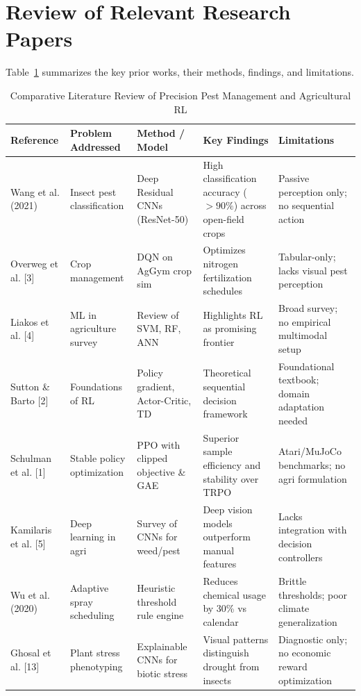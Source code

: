 \documentclass[12pt,a4paper]{report}
\begin{document}
\section{Review of Relevant Research Papers}
Table~\ref{tab:lit_review} summarizes the key prior works, their methods, findings, and limitations.

\begin{table}[H]
\centering
\small
\caption{Comparative Literature Review of Precision Pest Management and Agricultural RL}
\label{tab:lit_review}
\begin{tabular}{p{2.3cm}p{2.6cm}p{2.6cm}p{3.5cm}p{3.0cm}}
\toprule
\textbf{Reference} & \textbf{Problem Addressed} & \textbf{Method / Model} & \textbf{Key Findings} & \textbf{Limitations} \\
\midrule
Wang et al. (2021) & Insect pest classification & Deep Residual CNNs (ResNet-50) & High classification accuracy ($>90\%$) across open-field crops & Passive perception only; no sequential action \\
Overweg et al. [3] & Crop management & DQN on AgGym crop sim & Optimizes nitrogen fertilization schedules & Tabular-only; lacks visual pest perception \\
Liakos et al. [4] & ML in agriculture survey & Review of SVM, RF, ANN & Highlights RL as promising frontier & Broad survey; no empirical multimodal setup \\
Sutton \& Barto [2] & Foundations of RL & Policy gradient, Actor-Critic, TD & Theoretical sequential decision framework & Foundational textbook; domain adaptation needed \\
Schulman et al. [1] & Stable policy optimization & PPO with clipped objective \& GAE & Superior sample efficiency and stability over TRPO & Atari/MuJoCo benchmarks; no agri formulation \\
Kamilaris et al. [5] & Deep learning in agri & Survey of CNNs for weed/pest & Deep vision models outperform manual features & Lacks integration with decision controllers \\
Wu et al. (2020) & Adaptive spray scheduling & Heuristic threshold rule engine & Reduces chemical usage by 30\% vs calendar & Brittle thresholds; poor climate generalization \\
Ghosal et al. [13] & Plant stress phenotyping & Explainable CNNs for biotic stress & Visual patterns distinguish drought from insects & Diagnostic only; no economic reward optimization \\
\bottomrule
\end{tabular}
\end{table}
\end{document}
